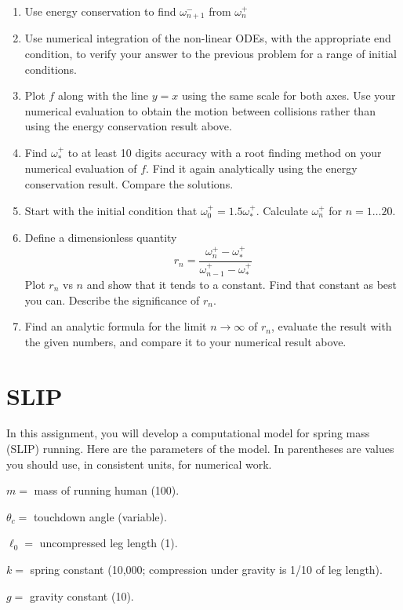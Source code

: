 \begin{enumerate}
\item Use energy conservation to find $\omega_{n+1}^-$ from $\omega_{n}^{+}$
\item Use numerical integration of the non-linear ODEs, with the appropriate
end condition, to verify  your answer to the previous problem for a range of
initial conditions.  

\item Plot $f$ along with the line $y=x$ using the same scale for both
axes.  Use your numerical evaluation to obtain the motion between collisions rather than using the energy conservation result above.

\item Find $\omega_{*}^{+}$ to at least 10 digits accuracy with a root finding method on your numerical evaluation of $f$.  Find it again analytically using the energy conservation result. Compare the solutions.

\item Start with the initial condition that $\omega_{0}^{+} = 1.5 \omega_{*}^{+}$.
Calculate $\omega_{n}^{+}$ for $n = 1 \dots 20$.

\item  Define a dimensionless quantity
\begin{equation}
r_{n} = \frac{ \omega_{n}^{+} -\omega_{*}^{+}}{ \omega_{n-1}^{+} -\omega_{*}^{+}}
\end{equation}
Plot $r_{n}$ vs $n$ and show that it tends to a constant.  Find that constant as best
you can. Describe the significance of $r_{n}$.

\item Find an analytic formula for the limit $n\rightarrow\infty$ of $r_n$, evaluate the result with the given numbers, and compare it to your numerical result above.


\end{enumerate}

\newpage
\section{SLIP}

In this assignment, you will develop a computational model for spring mass (SLIP) running.
Here are the parameters of the model.  In parentheses are values you should use,
in consistent units, for numerical work.

\begin{description}
\item{$m=$} mass of running human (100).
\item{$ \theta_{c}=$} touchdown angle (variable).
\item{$\ell_{0} =$} uncompressed leg length (1).
\item{$ k=$}  spring constant (10,000; compression under gravity is 1/10 of leg length).
\item{$ g=$}  gravity constant (10).
\end{description}

